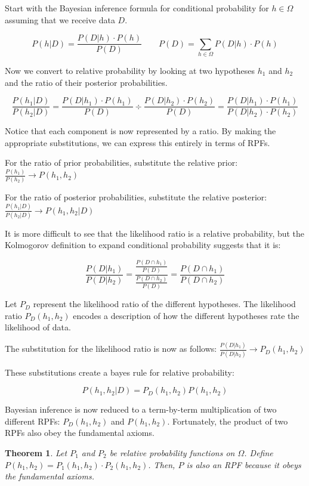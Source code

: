 \documentclass[twoside]{article}
\theoremstyle{plain}%
\newtheorem{theorem}{Theorem}[section]
\theoremstyle{definition}
\theoremstyle{remark}
\begin{document}
Start with the Bayesian inference formula for conditional probability for \(h \in \Omega\) assuming that we receive data \(D\).

\[P(h|D) = \frac{P(D|h) \cdot P(h)}{P(D)} \qquad P(D) = \sum_{h \in \Omega} P(D|h) \cdot P(h)\]

Now we convert to relative probability by looking at two hypotheses \(h_1\) and \(h_2\) and the ratio of their posterior probabilities.

\[\frac{P(h_1|D)}{P(h_2| D)} = \frac{P(D|h_1) \cdot P(h_1)}{P(D)} \div \frac{P(D|h_2) \cdot P(h_2)}{P(D)} = \frac{P(D|h_1) \cdot P(h_1)}{P(D|h_2) \cdot P(h_2)} \]

Notice that each component is now represented by a ratio. By making the appropriate substitutions, we can express this entirely in terms of RPFs.

For the ratio of prior probabilities, substitute the relative prior: \(\frac{P(h_1)}{P(h_2)} \rightarrow P(h_1, h_2) \)

For the ratio of posterior probabilities, substitute the relative posterior: \(\frac{P(h_1|D)}{P(h_2|D)} \rightarrow P(h_1, h_2|D) \)

It is more difficult to see that the likelihood ratio is a relative probability, but the Kolmogorov definition to expand conditional probability suggests that it is:

\[\frac{P(D|h_1)}{P(D|h_2)} = \frac{\frac{P(D \cap h_1)}{P(D)}}{\frac{P(D \cap h_2)}{P(D)}} = \frac{P(D \cap h_1)}{P(D \cap h_2)} \]

Let \(P_D\) represent the likelihood ratio of the different hypotheses. The likelihood ratio \(P_D(h_1, h_2)\) encodes a description of how the different hypotheses rate the likelihood of data.

The substitution for the likelihood ratio is now as follows: \(\frac{P(D|h_1)}{P(D|h_2)} \rightarrow P_D(h_1, h_2) \)

These substitutions create a bayes rule for relative probability:

\begin{equation}
P(h_1, h_2|D) = P_D(h_1, h_2) P(h_1, h_2)
\end{equation}
 
Bayesian inference is now reduced to a term-by-term multiplication of two different RPFs: \(P_D(h_1, h_2)\) and \(P(h_1, h_2)\). Fortunately, the product of two RPFs also obey the fundamental axioms.

\begin{theorem} 
Let \(P_1\) and \(P_2\) be relative probability functions on \(\Omega\). Define \(P(h_1, h_2) = P_1(h_1, h_2) \cdot P_2(h_1, h_2)\). Then, \(P\) is also an RPF because it obeys the fundamental axioms.
\end{theorem}
\end{document}
